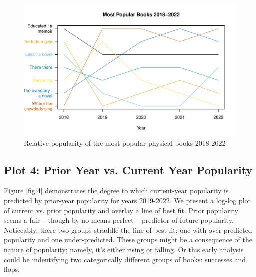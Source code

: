 \documentclass[10pt]{article}\usepackage[]{graphicx}\usepackage[]{xcolor}
\makeatletter
\def\maxwidth{ %
  \ifdim\Gin@nat@width>\linewidth
    \linewidth
  \else
    \Gin@nat@width
  \fi
}
\newenvironment{knitrout}{}{} %
\makeatother
\begin{document}
\begin{figure}[H]
\begin{center}
\begin{knitrout}
\color{fgcolor}
\includegraphics[width=\maxwidth]{figure/plot3-1} 
\end{knitrout}
\end{center}
\caption{Relative popularity of the most popular physical books 2018-2022}\label{fig:3}
\end{figure}

\subsection{Plot 4: Prior Year vs. Current Year Popularity}

Figure \ref{fig:4} demonstrates the degree to which current-year popularity is predicted by prior-year popularity for years 2019-2022. We present a log-log plot of current vs. prior popularity and overlay a line of best fit. Prior popularity seems a fair -- though by no means perfect -- predictor of future popularity. Noticeably, there two groups straddle the line of best fit: one with over-predicted popularity and one under-predicted. These groups might be a consequence of the nature of popularity; namely, it's either rising or falling. Or this early analysis could be indentifying two categorically different groups of books: successes and flops. 
\end{document}
